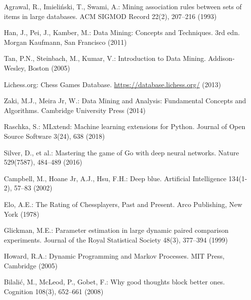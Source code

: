 \documentclass[11pt,a4paper]{article}
\begin{document}
\begin{thebibliography}{12}

Agrawal, R., Imieli\'nski, T., Swami, A.: Mining association rules between sets of items in large databases. ACM SIGMOD Record 22(2), 207--216 (1993)

Han, J., Pei, J., Kamber, M.: Data Mining: Concepts and Techniques. 3rd edn. Morgan Kaufmann, San Francisco (2011)

Tan, P.N., Steinbach, M., Kumar, V.: Introduction to Data Mining. Addison-Wesley, Boston (2005)

Lichess.org: Chess Games Database. \url{https://database.lichess.org/} (2013)

Zaki, M.J., Meira Jr, W.: Data Mining and Analysis: Fundamental Concepts and Algorithms. Cambridge University Press (2014)

Raschka, S.: MLxtend: Machine learning extensions for Python. Journal of Open Source Software 3(24), 638 (2018)

Silver, D., et al.: Mastering the game of Go with deep neural networks. Nature 529(7587), 484--489 (2016)

Campbell, M., Hoane Jr, A.J., Hsu, F.H.: Deep blue. Artificial Intelligence 134(1-2), 57--83 (2002)

Elo, A.E.: The Rating of Chessplayers, Past and Present. Arco Publishing, New York (1978)

Glickman, M.E.: Parameter estimation in large dynamic paired comparison experiments. Journal of the Royal Statistical Society 48(3), 377--394 (1999)

Howard, R.A.: Dynamic Programming and Markov Processes. MIT Press, Cambridge (2005)

Bilali\'c, M., McLeod, P., Gobet, F.: Why good thoughts block better ones. Cognition 108(3), 652--661 (2008)

\end{thebibliography}
\end{document}
